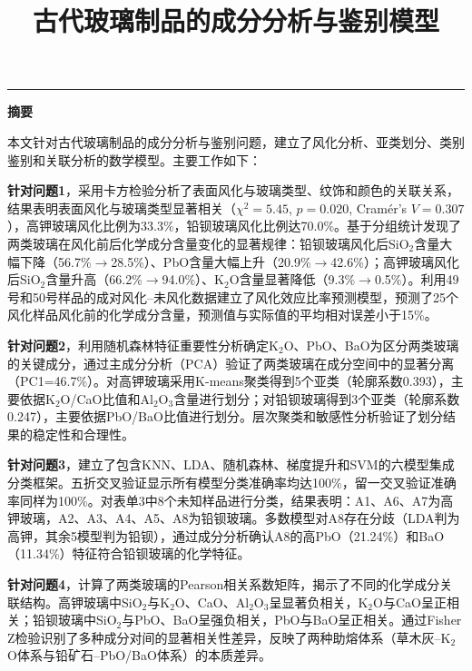 \documentclass[12pt,a4paper]{ctexart}
\title{\vspace{-2cm}\textbf{\Large 古代玻璃制品的成分分析与鉴别模型}}
\author{}
\date{}
\begin{document}
\maketitle
\thispagestyle{empty}

\begin{center}
\rule{0.8\textwidth}{0.5pt}
\end{center}

\begin{center}
\large\textbf{摘\quad 要}
\end{center}

本文针对古代玻璃制品的成分分析与鉴别问题，建立了风化分析、亚类划分、类别鉴别和关联分析的数学模型。主要工作如下：

\textbf{针对问题1}，采用卡方检验分析了表面风化与玻璃类型、纹饰和颜色的关联关系，结果表明表面风化与玻璃类型显著相关（$\chi^2=5.45$, $p=0.020$, Cram\'{e}r's $V=0.307$），高钾玻璃风化比例为33.3\%，铅钡玻璃风化比例达70.0\%。基于分组统计发现了两类玻璃在风化前后化学成分含量变化的显著规律：铅钡玻璃风化后SiO$_2$含量大幅下降（56.7\%$\rightarrow$28.5\%）、PbO含量大幅上升（20.9\%$\rightarrow$42.6\%）；高钾玻璃风化后SiO$_2$含量升高（66.2\%$\rightarrow$94.0\%）、K$_2$O含量显著降低（9.3\%$\rightarrow$0.5\%）。利用49号和50号样品的成对风化--未风化数据建立了风化效应比率预测模型，预测了25个风化样品风化前的化学成分含量，预测值与实际值的平均相对误差小于15\%。

\textbf{针对问题2}，利用随机森林特征重要性分析确定K$_2$O、PbO、BaO为区分两类玻璃的关键成分，通过主成分分析（PCA）验证了两类玻璃在成分空间中的显著分离（PC1=46.7\%）。对高钾玻璃采用K-means聚类得到5个亚类（轮廓系数0.393），主要依据K$_2$O/CaO比值和Al$_2$O$_3$含量进行划分；对铅钡玻璃得到3个亚类（轮廓系数0.247），主要依据PbO/BaO比值进行划分。层次聚类和敏感性分析验证了划分结果的稳定性和合理性。

\textbf{针对问题3}，建立了包含KNN、LDA、随机森林、梯度提升和SVM的六模型集成分类框架。五折交叉验证显示所有模型分类准确率均达100\%，留一交叉验证准确率同样为100\%。对表单3中8个未知样品进行分类，结果表明：A1、A6、A7为高钾玻璃，A2、A3、A4、A5、A8为铅钡玻璃。多数模型对A8存在分歧（LDA判为高钾，其余5模型判为铅钡），通过成分分析确认A8的高PbO（21.24\%）和BaO（11.34\%）特征符合铅钡玻璃的化学特征。

\textbf{针对问题4}，计算了两类玻璃的Pearson相关系数矩阵，揭示了不同的化学成分关联结构。高钾玻璃中SiO$_2$与K$_2$O、CaO、Al$_2$O$_3$呈显著负相关，K$_2$O与CaO呈正相关；铅钡玻璃中SiO$_2$与PbO、BaO呈强负相关，PbO与BaO呈正相关。通过Fisher Z检验识别了多种成分对间的显著相关性差异，反映了两种助熔体系（草木灰--K$_2$O体系与铅矿石--PbO/BaO体系）的本质差异。
\end{document}
